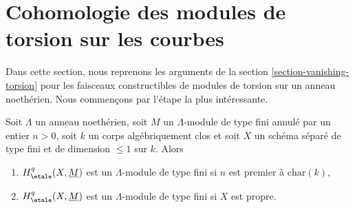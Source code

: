 \section{Cohomologie des modules de torsion sur les courbes}
\label{section-vanishing-torsion-coefficients}

\noindent
Dans cette section, nous reprenons les arguments de la
section \ref{section-vanishing-torsion}
pour les faisceaux constructibles de modules de torsion
sur un anneau noethérien. Nous commençons par l'étape la plus intéressante.

\begin{lemma}
\label{lemma-constant-statements-coefficients}
Soit $\Lambda$ un anneau noethérien, soit $M$ un $\Lambda$-module de type fini annulé
par un entier $n > 0$, soit $k$ un corps algébriquement clos et soit $X$ un
schéma séparé de type fini et de dimension $\leq 1$ sur $k$.
Alors
\begin{enumerate}
\item $H^q_\etale(X, \underline{M})$ est un $\Lambda$-module de type fini
si $n$ est premier à $\text{char}(k)$,
\item $H^q_\etale(X, \underline{M})$ est un $\Lambda$-module de type fini
si $X$ est propre.
\end{enumerate}
\end{lemma}

